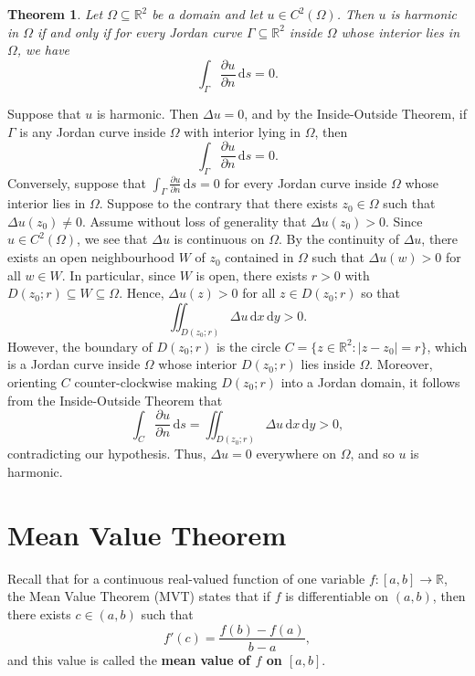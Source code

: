 \documentclass[10pt]{article}
\makeatletter
\newcommand{\R}{\mathbb{R}}
\newcommand{\dd}{\,\mathrm{d}}
\theoremstyle{newstyle}
\newtheorem{thm}{Theorem}[section]
\newenvironment{pf}[1][\proofname]{\par
  \pushQED{\qed}%
  \normalfont \topsep0\p@\relax
  \trivlist
  \item[\hskip\labelsep\scshape
  #1\@addpunct{.}]\ignorespaces
}{%
  \popQED\endtrivlist\@endpefalse
}
\makeatother
\begin{document}
\begin{thm}
Let $\Omega \subseteq \R^2$ be a domain and let $u \in C^2(\Omega)$. Then 
$u$ is harmonic in $\Omega$ if and only if for every Jordan curve $\Gamma \subseteq \R^2$ 
inside $\Omega$ whose interior lies in $\Omega$, we have 
\[ \int_\Gamma \frac{\partial u}{\partial n}\dd s = 0. \]
\end{thm}
\begin{pf}
Suppose that $u$ is harmonic. Then $\Delta u = 0$, and by the Inside-Outside Theorem, 
if $\Gamma$ is any Jordan curve inside $\Omega$ with interior lying in $\Omega$, then 
\[ \int_\Gamma \frac{\partial u}{\partial n}\dd s = 0. \]
Conversely, suppose that $\int_\Gamma \frac{\partial u}{\partial n}\dd s = 0$ 
for every Jordan curve inside $\Omega$ whose interior lies in $\Omega$. 
Suppose to the contrary that there exists $z_0 \in \Omega$ such that 
$\Delta u(z_0) \neq 0$. Assume without loss of generality that $\Delta u(z_0) > 0$. 
Since $u \in C^2(\Omega)$, we see that $\Delta u$ is continuous on $\Omega$. 
By the continuity of $\Delta u$, there exists an open neighbourhood $W$ of $z_0$ 
contained in $\Omega$ such that $\Delta u(w) > 0$ for all $w \in W$. 
In particular, since $W$ is open, there exists $r > 0$ with $D(z_0; r) \subseteq W \subseteq \Omega$. 
Hence, $\Delta u(z) > 0$ for all $z \in D(z_0; r)$ so that 
\[ \iint_{D(z_0; r)} \Delta u \dd x \dd y > 0. \]
However, the boundary of $D(z_0; r)$ is the circle $C = \{z \in \R^2 : |z - z_0| = r\}$, 
which is a Jordan curve inside $\Omega$ whose interior $D(z_0; r)$ lies inside $\Omega$. 
Moreover, orienting $C$ counter-clockwise making $D(z_0; r)$ into a Jordan domain, 
it follows from the Inside-Outside Theorem that 
\[ \int_C \frac{\partial u}{\partial n}\dd s = \iint_{D(z_0;r)} \Delta u \dd x \dd y > 0, \]
contradicting our hypothesis. Thus, $\Delta u = 0$ everywhere on $\Omega$, and so $u$ is harmonic.
\end{pf}

\newpage 
\section{Mean Value Theorem}

Recall that for a continuous real-valued function of one variable $f : [a, b] \to \R$, the 
Mean Value Theorem (MVT) states that if $f$ is differentiable on $(a, b)$, then there exists 
$c \in (a, b)$ such that 
\[ f'(c) = \frac{f(b) - f(a)}{b-a}, \]
and this value is called the {\bf mean value of $f$ on $[a, b]$}.
\end{document}
